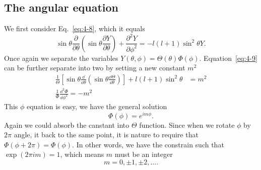 \subsection{The angular equation}
We first consider Eq.~\eqref{eq:4-8}, which it equals
\begin{equation}
  \label{eq:4-9}
  \sin\theta \frac{\partial}{\partial \theta} \left( \sin\theta \frac{\partial Y}{\partial \theta} \right) + \frac{\partial^{2} Y}{\partial \phi^{2}} = -l \left( l+1 \right) \sin^{2} \theta Y.
\end{equation}
Once again we separate the variables $Y \left( \theta,\phi \right) = \Theta \left( \theta \right) \Phi \left( \phi \right) $.
Equation~\eqref{eq:4-9} can be further separate into two by setting a new constant $m^{2}$
\begin{align}
  \label{eq:4-10}
  \frac{1}{\Theta} \left[ \sin\theta \frac{\dd}{\dd \theta} \left( \sin\theta \frac{\dd \Theta}{\dd \theta} \right) \right] + l \left( l+1 \right) \sin^{2} \theta &= m^{2} \\
  \label{eq:4-11}
  \frac{1}{\Phi} \frac{\dd^{2} \Phi}{\dd \phi^{2}} = - m^{2}
\end{align}
This $\phi$ equation is easy, we have the general solution
\begin{equation}
  \label{eq:4-12}
  \Phi \left( \phi \right) = e^{im\phi}.
\end{equation}
Again we could absorb the canstant into $\Theta$ function.
Since when we rotate $\phi$ by $2\pi$ angle, it back to the same point, it is nature to require that $\Phi \left( \phi + 2\pi \right) = \Phi \left( \phi \right)$.
In other words, we have the constrain such that $\exp \left( 2\pi i m \right)=1$, which means $m$ must be an integer
\begin{equation}
  \label{eq:4-13}
  m = 0, \pm 1, \pm 2, \ldots.
\end{equation}

